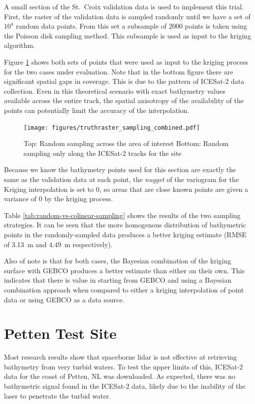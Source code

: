 A small section of the St.~Croix validation data is used to implement this trial. First, the raster of the validation data is sampled randomly until we have a set of $10^4$ random data points. From this set a subsample of $2000$ points is taken using the Poisson disk sampling method. This subsample is used as input to the kriging algorithm.

Figure \ref{fig:truthras-sampling} shows both sets of points that were used as input to the kriging process for the two cases under evaluation. Note that in the bottom figure  there are significant spatial gaps in coverage. This is due to the pattern of ICESat-2 data collection. Even in this theoretical scenario with exact bathymetry values available across the entire track, the spatial anisotropy of the availability of the points can potentially limit the accuracy of the interpolation.

\begin{figure}[h]
    \centering
    \texttt{[image: figures/truthraster\_sampling\_combined.pdf]}
    \caption[Random sampling points for validation test]{Top: Random sampling across the area of interest \newline   Bottom: Random sampling only along the ICESat-2 tracks for the site}
    \label{fig:truthras-sampling}
\end{figure}

Because we know the bathymetry points used for this section are exactly the same as the validation data at each point, the \emph{nugget} of the variogram for the Kriging interpolation is set to $0$, so areas that are close known points are given a variance of $0$ by the kriging process. 


Table \ref{tab:random-vs-colinear-sampling} shows the results of the two sampling strategies. It can be seen that the more homogenous distribution of bathymetric points in the randomly-sampled data produces a better kriging estimate (RMSE of 3.13~m and 4.49~m respectively). 

Also of note is that for both cases, the Bayesian combination of the kriging surface with GEBCO produces a better estimate than either on their own. This indicates that there is value in starting from GEBCO and using a Bayesian combination approach when compared to either a kriging interpolation of point data or using GEBCO as a data source.


\section{Petten Test Site}
Most research results show that spaceborne lidar is not effective at retrieving bathymetry from very turbid waters. To test the upper limits of this, ICESat-2 data for the coast of Petten, NL was downloaded. As expected, there was no bathymetric signal found in the ICESat-2 data, likely due to the inability of the laser to penetrate the turbid water. 

